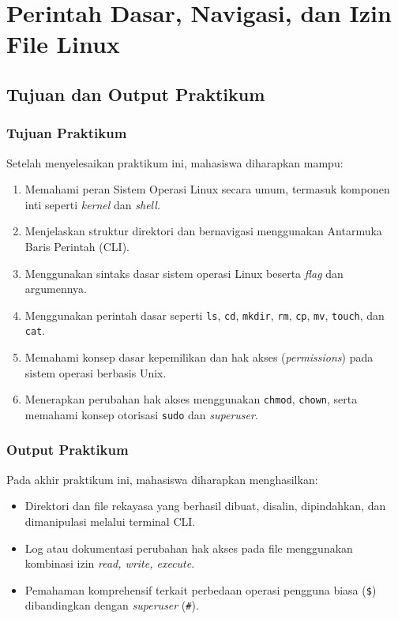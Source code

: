 
\chapter{Perintah Dasar, Navigasi, dan Izin File Linux}
\label{chap:modul-03}

\section{Tujuan dan Output Praktikum}

\subsection{Tujuan Praktikum}
Setelah menyelesaikan praktikum ini, mahasiswa diharapkan mampu:
\begin{enumerate}
	\item Memahami peran Sistem Operasi Linux secara umum, termasuk komponen inti seperti \textit{kernel} dan \textit{shell}.
	\item Menjelaskan struktur direktori dan bernavigasi menggunakan Antarmuka Baris Perintah (CLI).
	\item Menggunakan sintaks dasar sistem operasi Linux beserta \textit{flag} dan argumennya.
	\item Menggunakan perintah dasar seperti \texttt{ls}, \texttt{cd}, \texttt{mkdir}, \texttt{rm}, \texttt{cp}, \texttt{mv}, \texttt{touch}, dan \texttt{cat}.
	\item Memahami konsep dasar kepemilikan dan hak akses (\textit{permissions}) pada sistem operasi berbasis Unix.
	\item Menerapkan perubahan hak akses menggunakan \texttt{chmod}, \texttt{chown}, serta memahami konsep otorisasi \texttt{sudo} dan \textit{superuser}.
\end{enumerate}

\subsection{Output Praktikum}
Pada akhir praktikum ini, mahasiswa diharapkan menghasilkan:
\begin{itemize}
	\item Direktori dan file rekayasa yang berhasil dibuat, disalin, dipindahkan, dan dimanipulasi melalui terminal CLI.
	\item Log atau dokumentasi perubahan hak akses pada file menggunakan kombinasi izin \textit{read, write, execute}.
	\item Pemahaman komprehensif terkait perbedaan operasi pengguna biasa (\texttt{\$}) dibandingkan dengan \textit{superuser} (\texttt{\#}).
\end{itemize}

